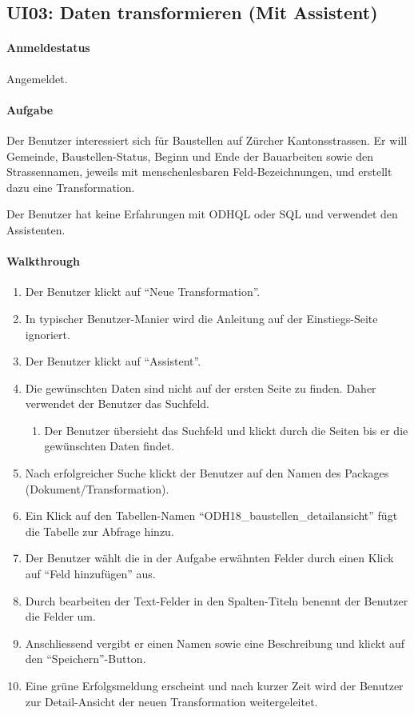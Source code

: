 \subsection{UI03: Daten transformieren (Mit Assistent)}\label{sec:ui-test-trf-ass}
\paragraph{Anmeldestatus} Angemeldet.
\paragraph{Aufgabe} Der Benutzer interessiert sich für Baustellen auf Zürcher Kantonsstrassen. Er will Gemeinde, Baustellen-Status, Beginn und Ende der Bauarbeiten sowie den Strassennamen, jeweils mit menschenlesbaren Feld-Bezeichnungen, und erstellt dazu eine Transformation.

Der Benutzer hat keine Erfahrungen mit ODHQL oder SQL und verwendet den Assistenten.

\paragraph{Walkthrough}
\begin{enumerate}
\item Der Benutzer klickt auf ``Neue Transformation''.
\item In typischer Benutzer-Manier wird die Anleitung auf der Einstiegs-Seite ignoriert.
\item Der Benutzer klickt auf ``Assistent''.
\item \label{ui-test-assist-begin} Die gewünschten Daten sind nicht auf der ersten Seite zu finden. Daher verwendet der Benutzer das Suchfeld.
  \begin{enumerate}[label=\labelenumi\alph*.]
  \item Der Benutzer übersieht das Suchfeld und klickt durch die Seiten bis er die gewünschten Daten findet.
  \end{enumerate}
\item Nach erfolgreicher Suche klickt der Benutzer auf den Namen des Packages (Dokument/Transformation).
\item Ein Klick auf den Tabellen-Namen ``ODH18\_baustellen\_detailansicht'' fügt die Tabelle zur Abfrage hinzu.
\item Der Benutzer wählt die in der Aufgabe erwähnten Felder durch einen Klick auf ``Feld hinzufügen'' aus.
\item \label{ui-test-assist-end}Durch bearbeiten der Text-Felder in den Spalten-Titeln benennt der Benutzer die Felder um.
\item Anschliessend vergibt er einen Namen sowie eine Beschreibung und klickt auf den ``Speichern''-Button.
\item Eine grüne Erfolgsmeldung erscheint und nach kurzer Zeit wird der Benutzer zur Detail-Ansicht der neuen Transformation weitergeleitet.
\end{enumerate}


